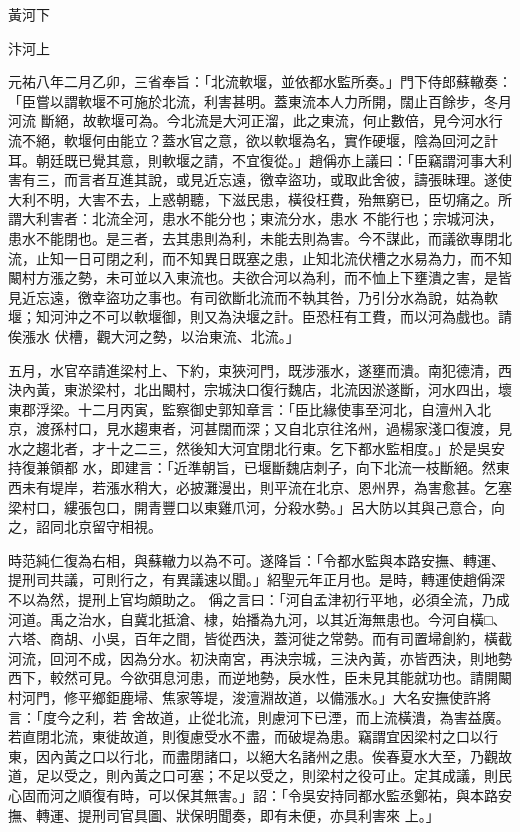 
\begin{pinyinscope}

 黃河下



 汴河上



 元祐八年二月乙卯，三省奉旨：「北流軟堰，並依都水監所奏。」門下侍郎蘇轍奏：「臣嘗以謂軟堰不可施於北流，利害甚明。蓋東流本人力所開，闊止百餘步，冬月河流
 斷絕，故軟堰可為。今北流是大河正溜，此之東流，何止數倍，見今河水行流不絕，軟堰何由能立？蓋水官之意，欲以軟堰為名，實作硬堰，陰為回河之計耳。朝廷既已覺其意，則軟堰之請，不宜復從。」趙偁亦上議曰：「臣竊謂河事大利害有三，而言者互進其說，或見近忘遠，徼幸盜功，或取此舍彼，譸張昧理。遂使大利不明，大害不去，上惑朝聽，下滋民患，橫役枉費，殆無窮已，臣切痛之。所謂大利害者：北流全河，患水不能分也；東流分水，患水
 不能行也；宗城河決，患水不能閉也。是三者，去其患則為利，未能去則為害。今不謀此，而議欲專閉北流，止知一日可閉之利，而不知異日既塞之患，止知北流伏槽之水易為力，而不知闞村方漲之勢，未可並以入東流也。夫欲合河以為利，而不恤上下壅潰之害，是皆見近忘遠，徼幸盜功之事也。有司欲斷北流而不執其咎，乃引分水為說，姑為軟堰；知河沖之不可以軟堰御，則又為決堰之計。臣恐枉有工費，而以河為戲也。請俟漲水
 伏槽，觀大河之勢，以治東流、北流。」



 五月，水官卒請進梁村上、下約，束狹河門，既涉漲水，遂壅而潰。南犯德清，西決內黃，東淤梁村，北出闞村，宗城決口復行魏店，北流因淤遂斷，河水四出，壞東郡浮梁。十二月丙寅，監察御史郭知章言：「臣比緣使事至河北，自澶州入北京，渡孫村口，見水趨東者，河甚闊而深；又自北京往洺州，過楊家淺口復渡，見水之趨北者，才十之二三，然後知大河宜閉北行東。乞下都水監相度。」於是吳安持復兼領都
 水，即建言：「近準朝旨，已堰斷魏店刺子，向下北流一枝斷絕。然東西未有堤岸，若漲水稍大，必披灘漫出，則平流在北京、恩州界，為害愈甚。乞塞梁村口，縷張包口，開青豐口以東雞爪河，分殺水勢。」呂大防以其與己意合，向之，詔同北京留守相視。



 時范純仁復為右相，與蘇轍力以為不可。遂降旨：「令都水監與本路安撫、轉運、提刑司共議，可則行之，有異議速以聞。」紹聖元年正月也。是時，轉運使趙偁深不以為然，提刑上官均頗助之。
 偁之言曰：「河自孟津初行平地，必須全流，乃成河道。禹之治水，自冀北抵滄、棣，始播為九河，以其近海無患也。今河自橫□、六塔、商胡、小吳，百年之間，皆從西決，蓋河徙之常勢。而有司置埽創約，橫截河流，回河不成，因為分水。初決南宮，再決宗城，三決內黃，亦皆西決，則地勢西下，較然可見。今欲弭息河患，而逆地勢，戾水性，臣未見其能就功也。請開闞村河門，修平鄉鉅鹿埽、焦家等堤，浚澶淵故道，以備漲水。」大名安撫使許將言：「度今之利，若
 舍故道，止從北流，則慮河下已湮，而上流橫潰，為害益廣。若直閉北流，東徙故道，則復慮受水不盡，而破堤為患。竊謂宜因梁村之口以行東，因內黃之口以行北，而盡閉諸口，以絕大名諸州之患。俟春夏水大至，乃觀故道，足以受之，則內黃之口可塞；不足以受之，則梁村之役可止。定其成議，則民心固而河之順復有時，可以保其無害。」詔：「令吳安持同都水監丞鄭祐，與本路安撫、轉運、提刑司官具圖、狀保明聞奏，即有未便，亦具利害來
 上。」




\end{pinyinscope}
